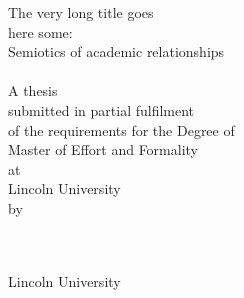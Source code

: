 
\hypertarget{TitlePage}{}


\begin{spacing}{1}
\begin{titlepage}
\begin{center}
\vspace*{9pt}
{\Medium\huge The very long title goes\\\smallskip here some:\\\bigskip Semiotics of academic relationships\\[1.7cm] }
 \\[1.1cm]
{\LARGE A thesis \\\smallskip submitted in partial fulfilment\\\smallskip of the requirements for the Degree of\\}
\medskip
{\LARGE Master of Effort and Formality\\
\vspace{37pt}
at\\
\vspace{17pt}
Lincoln University\\
\vspace{17pt}
by\\
\vspace{37pt}
\LARGE\namen\\[1.1cm]}

 \\[1.7cm]

{\Medium\LARGE Lincoln University\\\bigskip {}}
\vfill

\end{center}
\end{titlepage}
\end{spacing}



\begin{spacing}{1}
\section*{\vspace{-33pt}\normalfont\Large{}}
\end{spacing}
{}

